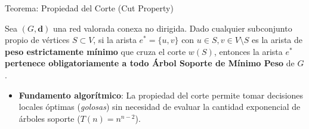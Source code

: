 \documentclass[
  ignorenonframetext,
]{beamer}
\providecommand{\tightlist}{%
  \setlength{\itemsep}{0pt}\setlength{\parskip}{0pt}}
\begin{document}
\begin{frame}{Teorema: Propiedad del Corte (Cut Property)}
\label{teorema-propiedad-del-corte-cut-property}
\begin{tcolorbox}[enhanced jigsaw, left=2mm, opacityback=0, titlerule=0mm, breakable, toptitle=1mm, rightrule=.15mm, bottomtitle=1mm, coltitle=black, title=\textcolor{quarto-callout-important-color}{\faExclamation}\hspace{0.5em}{Teorema: Propiedad del Corte (Cut Property)}, colframe=quarto-callout-important-color-frame, colbacktitle=quarto-callout-important-color!10!white, arc=.35mm, toprule=.15mm, leftrule=.75mm, bottomrule=.15mm, opacitybacktitle=0.6, colback=white]

Sea \((G, \mathbf{d})\) una red valorada conexa no dirigida. Dado
cualquier subconjunto propio de vértices \(S \subset V\), si la arista
\(e^* = \{u, v\}\) con \(u \in S, v \in V \setminus S\) es la arista de
\textbf{peso estrictamente mínimo} que cruza el corte \(w(S)\), entonces
la arista \(e^*\) \textbf{pertenece obligatoriamente a todo Árbol
Soporte de Mínimo Peso} de \(G\).

\end{tcolorbox}

\begin{itemize}
\tightlist
\item
  \textbf{Fundamento algorítmico}: La propiedad del corte permite tomar
  decisiones locales óptimas (\emph{golosas}) sin necesidad de evaluar
  la cantidad exponencial de árboles soporte (\(T(n) = n^{n-2}\)).
\end{itemize}
\end{frame}
\end{document}
